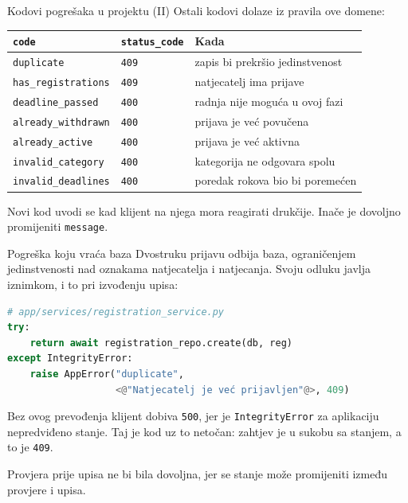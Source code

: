\begin{frame}{Kodovi pogrešaka u projektu (II)}
Ostali kodovi dolaze iz pravila ove domene:

\vspace{0.5em}
\begin{center}
{\small
\setlength{\tabcolsep}{3pt}
\renewcommand{\arraystretch}{1.2}
\begin{tabular}{@{}L{3.8cm}L{2.3cm}L{4.9cm}@{}}
  \toprule
  \textbf{\texttt{code}} & \textbf{\texttt{status\_code}} & \textbf{Kada} \\
  \midrule
  \texttt{duplicate}            & \texttt{409} & zapis bi prekršio jedinstvenost \\
  \texttt{has\_registrations}   & \texttt{409} & natjecatelj ima prijave \\
  \texttt{deadline\_passed}     & \texttt{400} & radnja nije moguća u ovoj fazi \\
  \texttt{already\_withdrawn}   & \texttt{400} & prijava je već povučena \\
  \texttt{already\_active}      & \texttt{400} & prijava je već aktivna \\
  \texttt{invalid\_category}    & \texttt{400} & kategorija ne odgovara spolu \\
  \texttt{invalid\_deadlines}   & \texttt{400} & poredak rokova bio bi poremećen \\
  \bottomrule
\end{tabular}
}
\end{center}

\vspace{0.5em}
Novi kod uvodi se kad klijent na njega mora reagirati drukčije. Inače je dovoljno promijeniti \texttt{message}.
\end{frame}

\begin{frame}[fragile]{Pogreška koju vraća baza}
Dvostruku prijavu odbija baza, ograničenjem jedinstvenosti nad oznakama natjecatelja i natjecanja. Svoju odluku javlja iznimkom, i to pri izvođenju upisa:

\begin{lstlisting}[language=python]
# app/services/registration_service.py
try:
    return await registration_repo.create(db, reg)
except IntegrityError:
    raise AppError("duplicate",
                   <@"Natjecatelj je već prijavljen"@>, 409)
\end{lstlisting}

\vspace{0.3em}
Bez ovog prevođenja klijent dobiva \texttt{500}, jer je \texttt{IntegrityError} za aplikaciju nepredviđeno stanje. Taj je kod uz to netočan: zahtjev je u sukobu sa stanjem, a to je \texttt{409}.

\vspace{0.3em}
Provjera prije upisa ne bi bila dovoljna, jer se stanje može promijeniti između provjere i upisa.
\end{frame}


